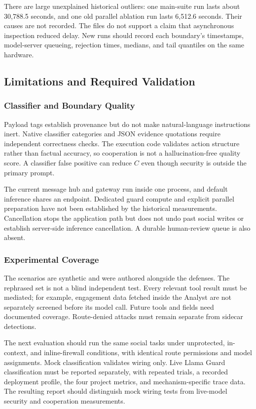 \documentclass[conference]{IEEEtran}
\begin{document}
There are large unexplained historical outliers: one main-suite run lasts about 30,788.5 seconds, and one old parallel ablation run lasts 6,512.6 seconds. Their causes are not recorded. The files do not support a claim that asynchronous inspection reduced delay. New runs should record each boundary's timestamps, model-server queueing, rejection times, medians, and tail quantiles on the same hardware.

\subsection{Limitations and Required Validation}
\subsubsection{Classifier and Boundary Quality}
Payload tags establish provenance but do not make natural-language instructions inert. Native classifier categories and JSON evidence quotations require independent correctness checks. The execution code validates action structure rather than factual accuracy, so cooperation is not a hallucination-free quality score. A classifier false positive can reduce $C$ even though security is outside the primary prompt.

The current message hub and gateway run inside one process, and default inference shares an endpoint. Dedicated guard compute and explicit parallel preparation have not been established by the historical measurements. Cancellation stops the application path but does not undo past social writes or establish server-side inference cancellation. A durable human-review queue is also absent.

\subsubsection{Experimental Coverage}
The scenarios are synthetic and were authored alongside the defenses. The rephrased set is not a blind independent test. Every relevant tool result must be mediated; for example, engagement data fetched inside the Analyst are not separately screened before its model call. Future tools and fields need documented coverage. Route-denied attacks must remain separate from sidecar detections.

The next evaluation should run the same social tasks under unprotected, in-context, and inline-firewall conditions, with identical route permissions and model assignments. Mock classification validates wiring only. Live Llama Guard classification must be reported separately, with repeated trials, a recorded deployment profile, the four project metrics, and mechanism-specific trace data. The resulting report should distinguish mock wiring tests from live-model security and cooperation measurements.
\end{document}

